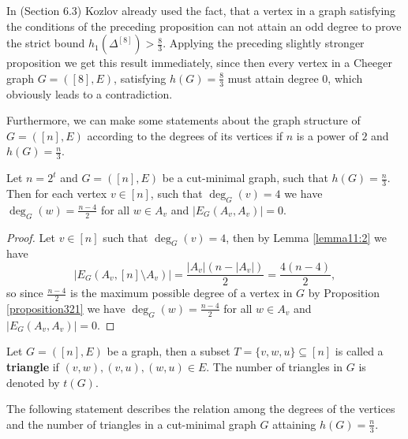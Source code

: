 \begin{expl}
In \cite{1} (Section 6.3) Kozlov already used the fact, that a vertex in a graph satisfying the conditions of the preceding proposition can not attain an odd degree to prove the strict bound \(h_1(\Delta^{[8]})>\frac{8}{3}\). Applying the preceding slightly stronger proposition we get this result immediately, since then every vertex in a Cheeger graph \(G=([8],E)\), satisfying \(h(G)=\frac{8}{3}\) must attain degree \(0\), which obviously leads to a contradiction.
\end{expl}

Furthermore, we can make some statements about the graph structure of \(G=([n],E)\) according to the degrees of its vertices if \(n\) is a power of \(2\) and \(h(G)=\frac{n}{3}\).

\begin{lem}\label{lemma362}
Let \(n=2^t\) and \(G=([n],E)\) be a cut-minimal graph, such that \(h(G)=\frac{n}{3}\). Then for each vertex \(v\in [n]\), such that \(\deg_G(v)=4\) we have \(\deg_G(w)=\frac{n-4}{2}\) for all \(w\in A_v\) and \(|E_G(A_v,A_v)|=0\).
\begin{proof}
Let \(v\in [n]\) such that \(\deg_G(v)=4\), then by Lemma \ref{lemma11:2} we have
\[
|E_G(A_v,[n]\setminus A_v)|=\frac{|A_v|(n-|A_v|)}{2}=\frac{4(n-4)}{2},
\]
so since \(\frac{n-4}{2}\) is the maximum possible degree of a vertex in \(G\) by Proposition \ref{proposition321} we have \(\deg_G(w)=\frac{n-4}{2}\) for all \(w\in A_v\) and \(|E_G(A_v,A_v)|=0\).
\end{proof}
\end{lem}

\begin{defi}
Let \(G=([n],E)\) be a graph, then a subset \(T=\{v,w,u\}\subseteq [n]\) is called a \textbf{triangle} if \((v,w),(v,u),(w,u)\in E\). The number of triangles in \(G\) is denoted by \(t(G)\).
\end{defi}

The following statement describes the relation among the degrees of the vertices and the number of triangles in a cut-minimal graph \(G\) attaining \(h(G)=\frac{n}{3}\).


